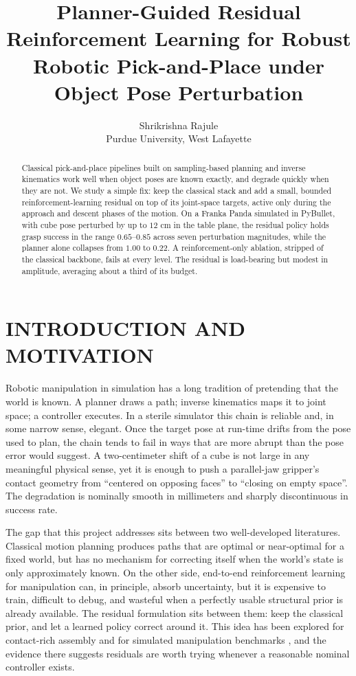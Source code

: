 \documentclass[letterpaper, 11 pt, journal, twoside]{IEEEtran}
\title{Planner-Guided Residual Reinforcement Learning for Robust Robotic Pick-and-Place under Object Pose Perturbation}
\author{Shrikrishna Rajule\\
Purdue University, West Lafayette}
\begin{document}
\maketitle

\begin{abstract}
Classical pick-and-place pipelines built on sampling-based planning and inverse kinematics work well when object poses are known exactly, and degrade quickly when they are not. We study a simple fix: keep the classical stack and add a small, bounded reinforcement-learning residual on top of its joint-space targets, active only during the approach and descent phases of the motion. On a Franka Panda simulated in PyBullet, with cube pose perturbed by up to $12$ cm in the table plane, the residual policy holds grasp success in the range $0.65$--$0.85$ across seven perturbation magnitudes, while the planner alone collapses from $1.00$ to $0.22$. A reinforcement-only ablation, stripped of the classical backbone, fails at every level. The residual is load-bearing but modest in amplitude, averaging about a third of its budget.
\end{abstract}

\section{INTRODUCTION AND MOTIVATION}

Robotic manipulation in simulation has a long tradition of pretending that the world is known. A planner draws a path; inverse kinematics maps it to joint space; a controller executes. In a sterile simulator this chain is reliable and, in some narrow sense, elegant. Once the target pose at run-time drifts from the pose used to plan, the chain tends to fail in ways that are more abrupt than the pose error would suggest. A two-centimeter shift of a cube is not large in any meaningful physical sense, yet it is enough to push a parallel-jaw gripper's contact geometry from ``centered on opposing faces'' to ``closing on empty space''. The degradation is nominally smooth in millimeters and sharply discontinuous in success rate.

The gap that this project addresses sits between two well-developed literatures. Classical motion planning \cite{Karaman2011RRTStar} produces paths that are optimal or near-optimal for a fixed world, but has no mechanism for correcting itself when the world's state is only approximately known. On the other side, end-to-end reinforcement learning for manipulation \cite{Levine2016Visuomotor,Yu2020MetaWorld} can, in principle, absorb uncertainty, but it is expensive to train, difficult to debug, and wasteful when a perfectly usable structural prior is already available. The residual formulation sits between them: keep the classical prior, and let a learned policy correct around it. This idea has been explored for contact-rich assembly \cite{Johannink2019Residual} and for simulated manipulation benchmarks \cite{Silver2018Residual}, and the evidence there suggests residuals are worth trying whenever a reasonable nominal controller exists.
\end{document}
